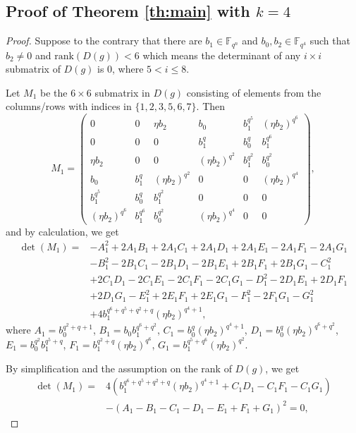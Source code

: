 \documentclass{amsart}
\theoremstyle{plain}
\theoremstyle{definition}
\newcommand{\fqn}{\mathbb{F}_{q^n}}
\newcommand{\rank}{\mathrm{rank}}
\begin{document}
	\subsection{Proof of Theorem \ref{th:main} with $k=4$}\label{subsec:k=4}
	\begin{proof}
		Suppose to the contrary that there are $b_1\in \fqn $ and $b_0,b_2\in\mathbb{F}_{q^4}$ such that $b_2\neq0$ and  $\rank(D( g))<6$ which means the determinant of any $i\times i$ submatrix of $D( g)$ is $0$, where $5<i\leq 8$. 
		
		Let $M_1$ be the $6\times 6$ submatrix in $D( g)$ consisting of elements from the columns/rows with indices in $\{1,2,3,5,6,7\}$.
		Then 	$$M_1=
		\begin{pmatrix}
			0&0& \eta b_2 &b_0&b_1^{q^5}&(\eta b_2)^{q^6}\\ 
			0&0&0 & b_1^q&b_0^{q}&  b_1^{q^6}\\
			\eta b_2&0&0& (\eta b_2)^{q^2}&b_1^{q^2}&b_0^{q^2} \\
			b_0&b_1^{q}&(\eta b_2)^{q^2}&0&0&	(\eta b_2)^{q^4} \\
			b_1^{q^5}&b_0^{q}&b_1^{q^2}&0&0&0\\
			(\eta b_2)^{q^6}&  b_1^{q^6}&b_0^{q^2}&	(\eta b_2)^{q^4}&0&0
		\end{pmatrix},$$
		and by calculation, we get
		\begin{align*}
			\det(M_1)=& -A_1^2+2A_1B_1+2A_1C_1+2A_1D_1+2A_1E_1-2A_1F_1-2A_1G_1\\
			&-B_1^2-2B_1C_1-2B_1D_1-2B_1E_1+2B_1F_1+2B_1G_1-C_1^2\\
			&+2C_1D_1-2C_1E_1-2C_1F_1-2C_1G_1-D_1^2-2D_1E_1+2D_1F_1\\
			&+2D_1G_1-E_1^2+2E_1F_1+2E_1G_1-F_1^2-2F_1G_1-G_1^2\\
			&+4b_1^{q^6+q^5+q^2+q}(\eta b_2)^{q^4+1},
		\end{align*}
		where $A_1=b_0^{q^2+q+1}$, $B_1=b_0b_1^{q^6+q^2}$, $C_1=b_0^q(\eta b_2)^{q^4+1}$, $D_1=b_0^q(\eta b_2)^{q^6+q^2}$, $E_1=b_0^{q^2}b_1^{q^5+q}$, $F_1=b_1^{q^2+q}(\eta b_2)^{q^6}$, $G_1=b_1^{q^5+q^6}(\eta b_2)^{q^2}$.
		
		By simplification and the assumption on the rank of $D( g)$, we get	
		\begin{align}
			\nonumber
			\det(M_1)=&4\left(b_1^{q^6+q^5+q^2+q}(\eta b_2)^{q^4+1}+C_1D_1-C_1F_1-C_1G_1\right)\\
			\label{eq:n_8}
			&-(A_1-B_1-C_1-D_1-E_1+F_1+G_1)^2=0,
		\end{align}
		

\end{proof}
\end{document}
